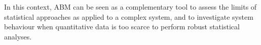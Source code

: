 \documentclass[review]{elsarticle}
\begin{document}


In this context, ABM can be seen as a complementary tool to assess the limits of statistical approaches as applied to a complex system, and to investigate system behaviour when quantitative data is too scarce to perform robust statistical analyses.

% 
% 
\end{document}
